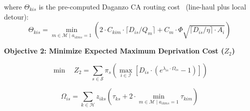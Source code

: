 \documentclass{llncs}
\begin{document}
where $\Theta_{kis}$ is the pre-computed Daganzo CA routing cost~\cite{daganzo2005logistics} (line-haul plus local detour):
\begin{equation*} \label{eq:daganzo_theta}
    \Theta_{kis} = \min_{m \in \mathcal{M}  \mid a_{ikms}=1} \left( 2 \cdot C_{kim} \cdot \lceil D_{is}/Q_m \rceil + C_{m} \cdot \Phi \sqrt{\lceil D_{is}/\eta \rceil \cdot A_i} \right)
\end{equation*}

\textbf{Objective 2: Minimize Expected Maximum Deprivation Cost ($Z_2$)}


\begin{equation} \label{eq:obj2}
    \min \quad Z_2 = \sum_{s \in \mathcal{S}} \pi_s \left( \max_{i \in \mathcal{I}} \left[ D_{is} \cdot \left( e^{\lambda_{is} \cdot \Omega_{is}} - 1 \right) \right] \right)
\end{equation}

\begin{equation*} \label{eq:waiting_time}
\Omega_{is} = \sum_{k \in \mathcal{H}} z_{iks} \left( \tau_{ks} + 2 \cdot \min_{m \in \mathcal{M}  \mid a_{ikms}=1} \tau_{kim} \right)
\end{equation*}
\end{document}
